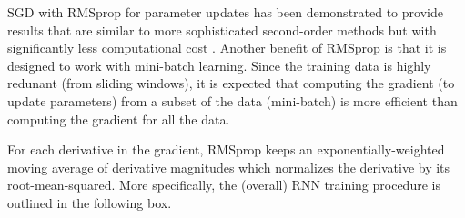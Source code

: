 SGD with RMSprop \cite{Tieleman2012} for parameter updates has been demonstrated to provide results that are similar to more sophisticated second-order methods but with significantly less computational cost \cite{Dauphin}.
%
Another benefit of RMSprop is that it is designed to work with mini-batch learning.
%
Since the training data is highly redunant (from sliding windows), it is expected that computing the gradient (to update parameters) from a subset of the data (mini-batch) is more efficient than computing the gradient for all the data.


For each derivative in the gradient, RMSprop keeps an exponentially-weighted moving average of derivative magnitudes which normalizes the derivative by its root-mean-squared.
%
More specifically, the (overall) RNN training procedure is outlined in the following box.


